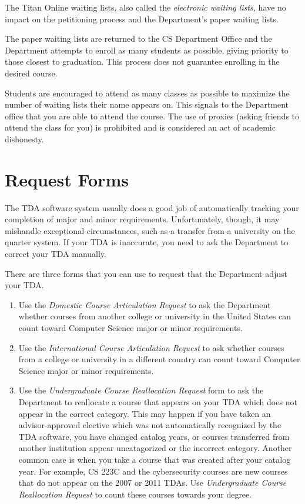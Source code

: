 \documentclass{book}
\begin{document}
The Titan Online waiting lists, also called the \emph{electronic
  waiting lists,} have no impact on the petitioning process and the
Department's paper waiting lists.

The paper waiting lists are returned to the CS Department Office and
the Department attempts to enroll as many students as possible, giving
priority to those closest to graduation. This process does not
guarantee enrolling in the desired course.

Students are encouraged to attend as many classes as possible to
maximize the number of waiting lists their name appears on. This
signals to the Department office that you are able to attend the
course. The use of proxies (asking friends to attend the class for
you) is prohibited and is considered an act of academic dishonesty.

\section{Request Forms}
\label{section:request_forms}

The TDA software system usually does a good job of automatically
tracking your completion of major and minor
requirements. Unfortunately, though, it may mishandle exceptional
circumstances, such as a transfer from a university on the quarter
system. If your TDA is inaccurate, you need to ask the Department to
correct your TDA manually.

There are three forms that you can use to request that the Department
adjust your TDA.
\begin{enumerate}
  \item Use the \emph{Domestic Course Articulation Request} to ask the
    Department whether courses from another college or university in
    the United States can count toward Computer Science major or minor
    requirements.
  \item Use the \emph{International Course Articulation Request} to
    ask whether courses from a college or university in a different
    country can count toward Computer Science major or minor
    requirements.
  \item Use the \emph{Undergraduate Course Reallocation Request} form
    to ask the Department to reallocate a course that appears on your
    TDA which does not appear in the correct category. This may happen
    if you have taken an advisor-approved elective which was not
    automatically recognized by the TDA software, you have changed
    catalog years, or courses transferred from another institution
    appear uncatagorized or the incorrect category.  Another common
    case is when you take a course that was created after your catalog
    year. For example, CS 223C and the cybersecurity courses are new
    courses that do not appear on the 2007 or 2011 TDAs. Use
    \emph{Undergraduate Course Reallocation Request} to count these
    courses towards your degree.
\end{enumerate}
\end{document}

